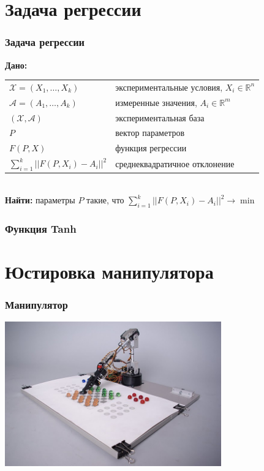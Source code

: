 \documentclass[24pt,pdf,hyperref={unicode},aspectratio=169]{beamer}
\begin{document}
\section{Задача регрессии}

\begin{frame}\frametitle{Задача регрессии}
{\bf Дано:}

\begin{tabular}{p{4cm} p{7cm}}
 $\mathcal{X}=(X_1,\ldots,X_k)$ & экспериментальные условия, $X_i\in\mathbb{R}^n$\\[0.1cm]
 $\mathcal{A}=(A_1,\ldots,A_k)$ & измеренные значения, $A_i\in\mathbb{R}^m$\\[0.1cm]
 $(\mathcal{X},\mathcal{A})$ & экспериментальная база \\[0.1cm]
 $P$ & вектор параметров \\[0.1cm]
 $F(P,X)$ & функция регрессии \\[0.1cm]
 $\sum_{i=1}^{k} ||F(P,X_i)-A_i||^2 $ & среднеквадратичное отклонение\\
 \end{tabular}\\[1cm]
 {\bf Найти:}
 параметры $P$ такие, что $\sum_{i=1}^{k} ||F(P,X_i)-A_i||^2 \rightarrow \min$
\end{frame}

\begin{frame}\frametitle{Функция Tanh}
\end{frame}



\section{Юстировка манипулятора}

\begin{frame}\frametitle{Манипулятор}
\begin{center}
\includegraphics[width=0.7\textwidth]{Images/Joseph.jpg}
\end{center}
\end{frame}
\end{document}
